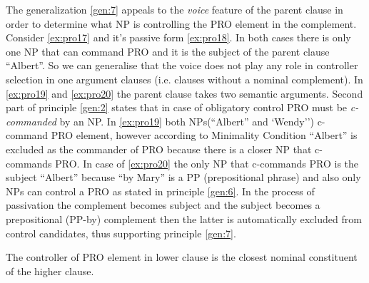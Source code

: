 The generalization \ref{gen:7} appeals to the \textit{voice} feature of the parent clause in order to determine what NP is controlling the PRO element in the complement. Consider \ref{ex:pro17} and it's passive form \ref{ex:pro18}. In both cases there is only one NP that can command PRO and it is the subject of the parent clause ``Albert''. So we can generalise that the voice does not play any role in controller selection in one argument clauses (i.e. clauses without a nominal complement). In \ref{ex:pro19} and \ref{ex:pro20} the parent clause takes two semantic arguments. Second part of principle \ref{gen:2} states that in case of obligatory control PRO must be \textit{c-commanded} by an NP. In \ref{ex:pro19} both NPs(``Albert'' and `Wendy'') c-command PRO element, however according to Minimality Condition\cite[p.~479]{Haegeman1991} ``Albert'' is excluded as the commander of PRO because there is a closer NP that c-commands PRO. In case of \ref{ex:pro20} the only NP that c-commands PRO is the subject ``Albert'' because ``by Mary'' is a PP (prepositional phrase) and also only NPs can control a PRO as stated in principle \ref{gen:6}. In the process of passivation the complement becomes subject and the subject becomes a prepositional (PP-by) complement then the latter is automatically excluded from control candidates, thus supporting principle \ref{gen:7}.

\begin{generalization}\label{gen:11}
	The controller of PRO element in lower clause is the closest nominal constituent of the higher clause.
\end{generalization}


